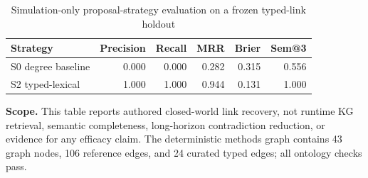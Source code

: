 \begin{table}[t]
\centering
\small
\renewcommand{\arraystretch}{1.20}
\caption{Simulation-only proposal-strategy evaluation on a frozen typed-link holdout}
\label{tab:kg-ontology-simulation}
\begin{tabular}{lrrrrr}
\toprule
Strategy & Precision & Recall & MRR & Brier & Sem@3 \\
\midrule
S0 degree baseline & 0.000 & 0.000 & 0.282 & 0.315 & 0.556 \\
S2 typed-lexical & 1.000 & 1.000 & 0.944 & 0.131 & 1.000 \\
\bottomrule
\end{tabular}
\end{table}
\noindent\textbf{Scope.} This table reports authored closed-world link recovery, not runtime KG retrieval, semantic completeness, long-horizon contradiction reduction, or evidence for any efficacy claim.
\noindent The deterministic methods graph contains 43 graph nodes, 106 reference edges, and 24 curated typed edges; all ontology checks pass.
